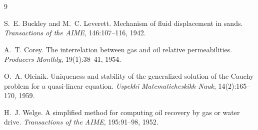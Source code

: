 \documentclass[11pt]{article}
\begin{document}
\begin{thebibliography}{9}

S.~E. Buckley and M.~C. Leverett.
\newblock Mechanism of fluid displacement in sands.
\newblock \emph{Transactions of the AIME}, 146:107--116, 1942.

A.~T. Corey.
\newblock The interrelation between gas and oil relative permeabilities.
\newblock \emph{Producers Monthly}, 19(1):38--41, 1954.

O.~A. Oleinik.
\newblock Uniqueness and stability of the generalized solution of the Cauchy problem for a quasi-linear equation.
\newblock \emph{Uspekhi Matematicheskikh Nauk}, 14(2):165--170, 1959.

H.~J. Welge.
\newblock A simplified method for computing oil recovery by gas or water drive.
\newblock \emph{Transactions of the AIME}, 195:91--98, 1952.

\end{thebibliography}
\end{document}
